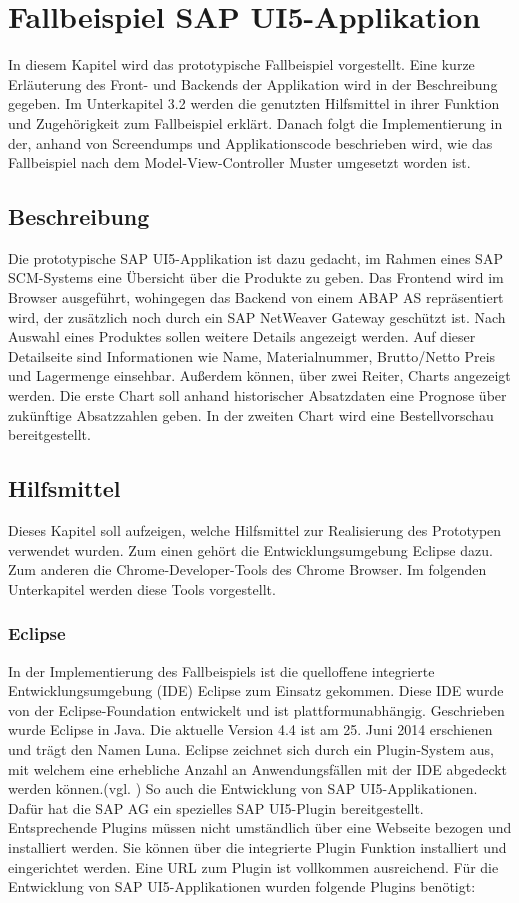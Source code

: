 \section{Fallbeispiel SAP UI5-Applikation}\label{fallbeispiel}
In diesem Kapitel wird das prototypische Fallbeispiel vorgestellt. Eine kurze Erläuterung des Front- und Backends der Applikation wird in der Beschreibung gegeben. Im Unterkapitel 3.2 werden die genutzten Hilfsmittel in ihrer Funktion und Zugehörigkeit zum Fallbeispiel erklärt. Danach folgt die Implementierung in der, anhand von Screendumps und Applikationscode beschrieben wird, wie das Fallbeispiel nach dem Model-View-Controller Muster umgesetzt worden ist.

\subsection{Beschreibung}
Die prototypische SAP UI5-Applikation ist dazu gedacht, im Rahmen eines SAP SCM-Systems eine Übersicht über die Produkte zu geben. Das Frontend wird im Browser ausgeführt, wohingegen das Backend von einem ABAP AS repräsentiert wird, der zusätzlich noch durch ein SAP NetWeaver Gateway geschützt ist. Nach Auswahl eines Produktes sollen weitere Details angezeigt werden. Auf dieser Detailseite sind Informationen wie Name, Materialnummer, Brutto/Netto Preis und Lagermenge einsehbar. Außerdem können, über zwei Reiter, Charts angezeigt werden. Die erste Chart soll anhand historischer Absatzdaten eine Prognose über zukünftige Absatzzahlen geben. In der zweiten Chart wird eine Bestellvorschau bereitgestellt.

\subsection{Hilfsmittel}
Dieses Kapitel soll aufzeigen, welche Hilfsmittel zur Realisierung des Prototypen verwendet wurden. Zum einen gehört die Entwicklungsumgebung Eclipse dazu. Zum anderen die Chrome-Developer-Tools des Chrome Browser. Im folgenden Unterkapitel werden diese Tools vorgestellt.

\subsubsection{Eclipse}
In der Implementierung des Fallbeispiels ist die quelloffene integrierte Entwicklungsumgebung (IDE) Eclipse zum Einsatz gekommen. Diese IDE wurde von der Eclipse-Foundation entwickelt und ist plattformunabhängig. Geschrieben wurde Eclipse in Java. Die aktuelle Version 4.4 ist am 25. Juni 2014 erschienen und trägt den Namen Luna. Eclipse zeichnet sich durch ein Plugin-System aus, mit welchem eine erhebliche Anzahl an Anwendungsfällen mit der IDE abgedeckt werden können.(vgl. \cite{WikiEclipse2014}) So auch die Entwicklung von SAP UI5-Applikationen. Dafür hat die SAP AG ein spezielles SAP UI5-Plugin bereitgestellt. Entsprechende Plugins müssen nicht umständlich über eine Webseite bezogen und installiert werden. Sie können über die integrierte Plugin Funktion installiert und eingerichtet werden. Eine URL zum Plugin ist vollkommen ausreichend. Für die Entwicklung von SAP UI5-Applikationen wurden folgende Plugins benötigt:
	
